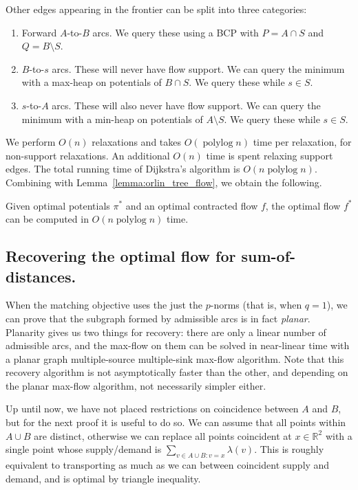 \documentclass[a4paper,UKenglish]{socg-lipics-v2018}
\def\polylog{\mathop{\mathrm{polylog}}}
\def\reals{\mathbb{R}}
\def\tsupply{\lambda}
\theoremstyle{plain}
\numberwithin{figure}{section}
\begin{document}
\begin{toappendix}
Other edges appearing in the frontier can be split into three categories:
\begin{enumerate}
\item Forward $A$-to-$B$ arcs.
	We query these using a BCP with $P = A \cap S$ and $Q = B \setminus S$.
\item $B$-to-$s$ arcs.
	These will never have flow support.
	We can query the minimum with a max-heap on potentials of $B \cap S$.
	We query these while $s \in S$.
\item $s$-to-$A$ arcs.
	These will also never have flow support.
	We can query the minimum with a min-heap on potentials of $A \setminus S$.
	We query these while $s \in S$.
\end{enumerate}
We perform $O(n)$ relaxations and takes $O(\polylog n)$ time per relaxation,
for non-support relaxations.
An additional $O(n)$ time is spent relaxing support edges.
The total running time of Dijkstra's algorithm is $O(n\polylog n)$.
Combining with Lemma~\ref{lemma:orlin_tree_flow}, we obtain the following.

\begin{lemma}
Given optimal potentials $\pi^*$ and an optimal contracted flow $f$, the
optimal flow $f^*$ can be computed in $O(n\polylog n)$ time.
\end{lemma}

\subsection{Recovering the optimal flow for sum-of-distances.}
\label{SSA:flow-recovery-planar}

When the matching objective uses the just the $p$-norms (that is, when $q=1$),
we can prove that the subgraph formed by admissible arcs is in fact \emph{planar}.
Planarity gives us two things for recovery:
there are only a linear number of admissible arcs, and the max-flow on them can
be solved in near-linear time with a planar graph multiple-source multiple-sink
max-flow algorithm.
Note that this recovery algorithm is not asymptotically faster than the other,
and depending on the planar max-flow algorithm, not necessarily simpler either.

Up until now, we have not placed restrictions on coincidence between $A$ and $B$,
but for the next proof it is useful to do so.
We can assume that all points within $A \cup B$ are distinct, otherwise we can
replace all points coincident at $x \in \reals^2$ with a single point whose
supply/demand is $\sum_{v \in A \cup B: v=x}\tsupply(v)$.
This is roughly equivalent to transporting as much as we can between
coincident supply and demand, and is optimal by triangle inequality.


\end{toappendix}
\end{document}
